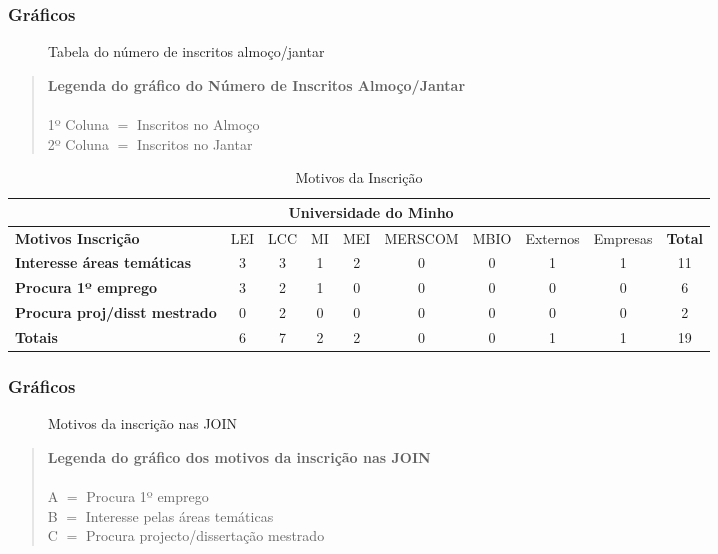 \documentclass[a4paper]{article}
\begin{document}
 \subsubsection{Gráficos}
 \begin{figure}[h]
 \centering
  
 \caption{Tabela do número de inscritos almoço/jantar}
 \end{figure}
 \begin{quotation}
 \textbf{Legenda do gráfico do Número de Inscritos Almoço/Jantar }\\ \\ 
 1º Coluna $=$ Inscritos no Almoço \\ 
 2º Coluna $=$ Inscritos no Jantar 
 \end{quotation}
 
 \newpage 
 
 \begin{table}[hl] 
 \begin{tabular}{|l|c|c|c|c|c|c|c|c|c|}  
 \cline{2-7} 
 \multicolumn{1}{c}{} & \multicolumn{6}{|c|}{Universidade do Minho} & \multicolumn{3}{c}{} \\ 
 \hline  
 \textbf{Motivos Inscrição} & LEI & LCC & MI & MEI & MERSCOM & MBIO & Externos & Empresas & \textbf{Total} \\ 
 \hline  
 \textbf{Interesse áreas temáticas} &3&3&1&2&0&0&1&1& 11 \\  
 \hline  
 \textbf{Procura 1º emprego} &3&2&1&0&0&0&0&0& 6 \\  
 \hline  
 \textbf{Procura proj/disst mestrado} &0&2&0&0&0&0&0&0& 2 \\  
 \hline  
 
 \textbf{Totais} &6&7&2&2&0&0&1&1&19 \\  
 \hline  
 \end{tabular}  
 \caption{Motivos da Inscrição} 
 \end{table}
  \subsubsection{Gráficos}
 \begin{figure}[h]
 \centering
 
 \caption{Motivos da inscrição nas JOIN}
 \end{figure}
 \begin{quotation}
 \textbf{Legenda do gráfico dos motivos da inscrição nas JOIN}\\ \\ 
 A $=$ Procura 1º emprego \\ 
 B $=$ Interesse pelas áreas temáticas \\ 
 C $=$ Procura projecto/dissertação mestrado 
 \end{quotation}
 
\end{document}
